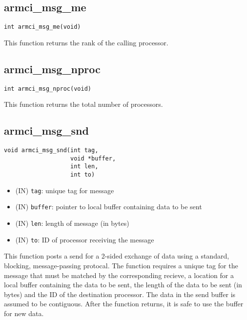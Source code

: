 \documentclass[12pt]{article}
\begin{document}
\subsection{armci\_msg\_me}
\begin{verbatim}
int armci_msg_me(void)
\end{verbatim}
This function returns the rank of the calling processor.

\subsection{armci\_msg\_nproc}
\begin{verbatim}
int armci_msg_nproc(void)
\end{verbatim}
This function returns the total number of processors.

\subsection{armci\_msg\_snd}
\begin{verbatim}
void armci_msg_snd(int tag,
                   void *buffer,
                   int len,
                   int to)
\end{verbatim}
\begin{itemize}
\item (IN) \texttt{tag}: unique tag for message
\item (IN) \texttt{buffer}: pointer to local buffer containing data to be sent
\item (IN) \texttt{len}: length of message (in bytes)
\item (IN) \texttt{to}: ID of processor receiving the message
\end{itemize}
This function posts a send for a 2-sided exchange of data using a standard,
blocking, message-passing protocal. The function requires a unique tag for the
message that must be matched by the corresponding recieve, a location for a
local buffer containing the data to be sent, the length of the data to be sent
(in bytes) and the ID of the destination processor. The data in the send buffer
is assumed to be contiguous. After the function returns, it is safe to use the
buffer for new data.
\end{document}
